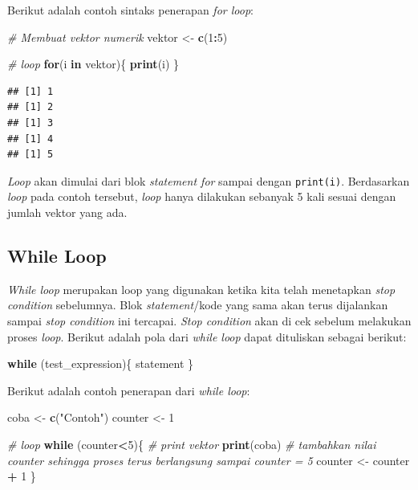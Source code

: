 \documentclass[]{book}
\newenvironment{Shaded}{\begin{snugshade}}{\end{snugshade}}
\newcommand{\KeywordTok}[1]{\textcolor[rgb]{0.13,0.29,0.53}{\textbf{#1}}}
\newcommand{\DecValTok}[1]{\textcolor[rgb]{0.00,0.00,0.81}{#1}}
\newcommand{\StringTok}[1]{\textcolor[rgb]{0.31,0.60,0.02}{#1}}
\newcommand{\CommentTok}[1]{\textcolor[rgb]{0.56,0.35,0.01}{\textit{#1}}}
\newcommand{\ControlFlowTok}[1]{\textcolor[rgb]{0.13,0.29,0.53}{\textbf{#1}}}
\newcommand{\OperatorTok}[1]{\textcolor[rgb]{0.81,0.36,0.00}{\textbf{#1}}}
\newcommand{\NormalTok}[1]{#1}
\begin{document}
Berikut adalah contoh sintaks penerapan \emph{for loop}:

\begin{Shaded}
\begin{Highlighting}[]
\CommentTok{# Membuat vektor numerik}
\NormalTok{vektor <-}\StringTok{ }\KeywordTok{c}\NormalTok{(}\DecValTok{1}\OperatorTok{:}\DecValTok{5}\NormalTok{)}

\CommentTok{# loop }
\ControlFlowTok{for}\NormalTok{(i }\ControlFlowTok{in}\NormalTok{ vektor)\{}
  \KeywordTok{print}\NormalTok{(i)}
\NormalTok{\}}
\end{Highlighting}
\end{Shaded}

\begin{verbatim}
## [1] 1
## [1] 2
## [1] 3
## [1] 4
## [1] 5
\end{verbatim}

\emph{Loop} akan dimulai dari blok \emph{statement for} sampai dengan
\texttt{print(i)}. Berdasarkan \emph{loop} pada contoh tersebut,
\emph{loop} hanya dilakukan sebanyak 5 kali sesuai dengan jumlah vektor
yang ada.

\subsection{While Loop}\label{while-loop}

\emph{While loop} merupakan loop yang digunakan ketika kita telah
menetapkan \emph{stop condition} sebelumnya. Blok \emph{statement}/kode
yang sama akan terus dijalankan sampai \emph{stop condition} ini
tercapai. \emph{Stop condition} akan di cek sebelum melakukan proses
\emph{loop}. Berikut adalah pola dari \emph{while loop} dapat dituliskan
sebagai berikut:

\begin{Shaded}
\begin{Highlighting}[]
\ControlFlowTok{while}\NormalTok{ (test_expression)\{}
\NormalTok{  statement}
\NormalTok{\}}
\end{Highlighting}
\end{Shaded}

Berikut adalah contoh penerapan dari \emph{while loop}:

\begin{Shaded}
\begin{Highlighting}[]
\NormalTok{coba <-}\StringTok{ }\KeywordTok{c}\NormalTok{(}\StringTok{"Contoh"}\NormalTok{)}
\NormalTok{counter <-}\StringTok{ }\DecValTok{1}

\CommentTok{# loop}
\ControlFlowTok{while}\NormalTok{ (counter}\OperatorTok{<}\DecValTok{5}\NormalTok{)\{}
  \CommentTok{# print vektor}
  \KeywordTok{print}\NormalTok{(coba)}
  \CommentTok{# tambahkan nilai counter sehingga proses terus berlangsung sampai counter = 5 }
\NormalTok{  counter <-}\StringTok{ }\NormalTok{counter }\OperatorTok{+}\StringTok{ }\DecValTok{1}
\NormalTok{\}}
\end{Highlighting}
\end{Shaded}
\end{document}
